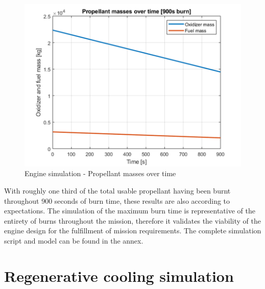 \begin{figure}[H]
	\centering\includegraphics[width=0.9\linewidth]{propmasstime}
	\caption{Engine simulation - Propellant masses over time}\label{fig3}
\end{figure}

With roughly one third of the total usable propellant having been burnt throughout 900 seconds of burn time, these results are also according to expectations. The simulation of the maximum burn time is representative of the entirety of burns throughout the mission, therefore it validates the viability of the engine design for the fulfillment of mission requirements. The complete simulation script and model can be found in the annex. \pagebreak 
\section{Regenerative cooling simulation}

